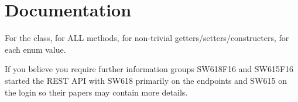 \section{Documentation}

For the class, for ALL methods, for non-trivial getters/setters/constructers, for each enum value.


If you believe you require further information groups SW618F16 and SW615F16 started the REST API with SW618 primarily on the endpoints and SW615 on the login so their papers may contain more details.